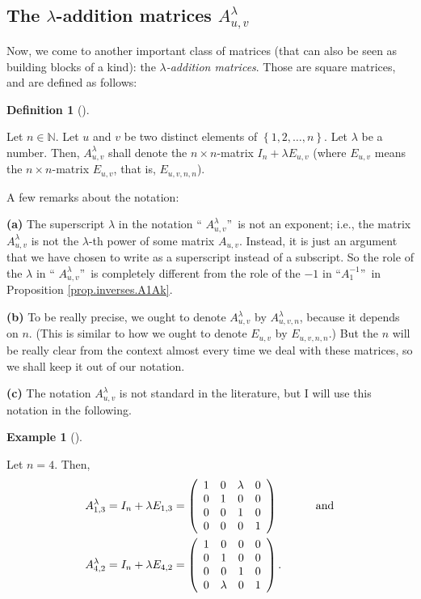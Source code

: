 \documentclass[numbers=enddot,12pt,final,onecolumn,notitlepage]{scrartcl}%
\theoremstyle{definition}
\newtheorem{defi}[theo]{Definition}
\newenvironment{definition}[1][]
{\begin{defi}[#1]\begin{leftbar}}
{\end{leftbar}\end{defi}}
\newtheorem{exam}[theo]{Example}
\newenvironment{example}[1][]
{\begin{exam}[#1]\begin{leftbar}}
{\end{leftbar}\end{exam}}
\begin{document}
\subsection{\label{sect.gauss.Alamuv}The $\lambda$-addition matrices
$A_{u,v}^{\lambda}$}

Now, we come to another important class of matrices (that can also be seen as
building blocks of a kind): the $\lambda$\textit{-addition matrices}. Those
are square matrices, and are defined as follows:

\begin{definition}
\label{def.Alamuv}Let $n\in\mathbb{N}$. Let $u$ and $v$ be two distinct
elements of $\left\{  1,2,\ldots,n\right\}  $. Let $\lambda$ be a number.
Then, $A_{u,v}^{\lambda}$ shall denote the $n\times n$-matrix $I_{n}+\lambda
E_{u,v}$ (where $E_{u,v}$ means the $n\times n$-matrix $E_{u,v}$, that is,
$E_{u,v,n,n}$).

A few remarks about the notation:

\textbf{(a)} The superscript $\lambda$ in the notation \textquotedblleft%
$A_{u,v}^{\lambda}$\textquotedblright\ is not an exponent; i.e., the matrix
$A_{u,v}^{\lambda}$ is not the $\lambda$-th power of some matrix $A_{u,v}$.
Instead, it is just an argument that we have chosen to write as a superscript
instead of a subscript. So the role of the $\lambda$ in \textquotedblleft%
$A_{u,v}^{\lambda}$\textquotedblright\ is completely different from the role
of the $-1$ in \textquotedblleft$A_{1}^{-1}$\textquotedblright\ in Proposition
\ref{prop.inverses.A1Ak}.

\textbf{(b)} To be really precise, we ought to denote $A_{u,v}^{\lambda}$ by
$A_{u,v,n}^{\lambda}$, because it depends on $n$. (This is similar to how we
ought to denote $E_{u,v}$ by $E_{u,v,n,n}$.) But the $n$ will be really clear
from the context almost every time we deal with these matrices, so we shall
keep it out of our notation.

\textbf{(c)} The notation $A_{u,v}^{\lambda}$ is not standard in the
literature, but I will use this notation in the following.
\end{definition}

\begin{example}
\label{exam.Alamuv}Let $n=4$. Then,%
\begin{align*}
A_{1,3}^{\lambda}  &  =I_{n}+\lambda E_{1,3}=\left(
\begin{array}
[c]{cccc}%
1 & 0 & \lambda & 0\\
0 & 1 & 0 & 0\\
0 & 0 & 1 & 0\\
0 & 0 & 0 & 1
\end{array}
\right)  \ \ \ \ \ \ \ \ \ \ \text{and}\\
A_{4,2}^{\lambda}  &  =I_{n}+\lambda E_{4,2}=\left(
\begin{array}
[c]{cccc}%
1 & 0 & 0 & 0\\
0 & 1 & 0 & 0\\
0 & 0 & 1 & 0\\
0 & \lambda & 0 & 1
\end{array}
\right)  .
\end{align*}

\end{example}
\end{document}
